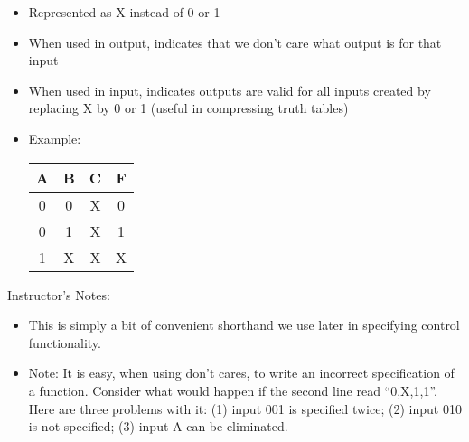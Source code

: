 \begin{frame}[fragile]
\begin{itemize}
	\item Represented as X instead of 0 or 1
	\item When used in output, indicates that we don't care what
	output is for that input
	\item When used in input, indicates outputs are valid for all
	inputs created by replacing X by 0 or 1 (useful in compressing
		truth tables)  
	\item Example:

		\begin{center}
		\begin{tabular}{ccc|c}
		A&B&C & F\\
		\hline
		0&0&X & 0\\
		0&1&X & 1\\
		1&X&X & X\\
		\end{tabular}
		\end{center}

\end{itemize}
\end{frame}

\BNotes\ifnum{}
\begin{frame}[fragile]
Instructor's Notes:
\begin{itemize}
\item This is simply a bit of convenient shorthand we use later in specifying
	control functionality.

\item Note: It is easy, when using don't cares, to write an incorrect
  specification of a function. Consider what would happen if the
  second line read ``0,X,1,1''. Here are three problems with it: (1)
  input 001 is specified twice; (2) input 010 is not specified; (3)
  input A can be eliminated.
\end{itemize}
\end{frame}
\fi\ENotes

